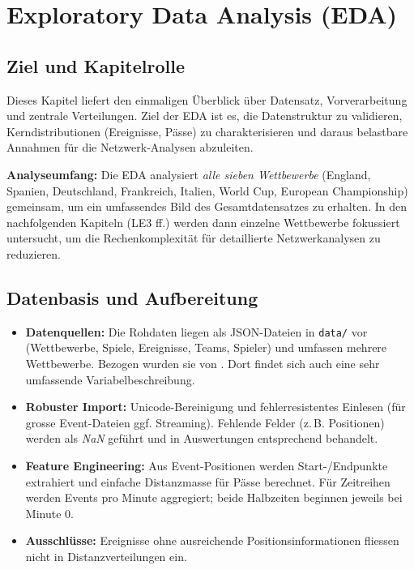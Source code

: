 \section{Exploratory Data Analysis (EDA)}

\subsection{Ziel und Kapitelrolle}
Dieses Kapitel liefert den einmaligen Überblick über Datensatz, Vorverarbeitung und zentrale Verteilungen. Ziel der EDA ist es, die Datenstruktur zu validieren, Kerndistributionen (Ereignisse, Pässe) zu charakterisieren und daraus belastbare Annahmen für die Netzwerk-Analysen abzuleiten.

\textbf{Analyseumfang:} Die EDA analysiert \emph{alle sieben Wettbewerbe} (England, Spanien, Deutschland, Frankreich, Italien, World Cup, European Championship) gemeinsam, um ein umfassendes Bild des Gesamtdatensatzes zu erhalten. In den nachfolgenden Kapiteln (LE3 ff.) werden dann einzelne Wettbewerbe fokussiert untersucht, um die Rechenkomplexität für detaillierte Netzwerkanalysen zu reduzieren.

\subsection{Datenbasis und Aufbereitung}
\begin{itemize}
  \item \textbf{Datenquellen:} Die Rohdaten liegen als JSON-Dateien in \texttt{data/} vor (Wettbewerbe, Spiele, Ereignisse, Teams, Spieler) und umfassen mehrere Wettbewerbe. Bezogen wurden sie von \cite{pappalardo-2019}. Dort findet sich auch eine sehr umfassende Variabelbeschreibung.
  \item \textbf{Robuster Import:} Unicode-Bereinigung und fehlerresistentes Einlesen (für grosse Event-Dateien ggf. Streaming). Fehlende Felder (z.\,B. Positionen) werden als \textit{NaN} geführt und in Auswertungen entsprechend behandelt.
  \item \textbf{Feature Engineering:} Aus Event-Positionen werden Start-/Endpunkte extrahiert und einfache Distanzmasse für Pässe berechnet. Für Zeitreihen werden Events pro Minute aggregiert; beide Halbzeiten beginnen jeweils bei Minute 0.
  \item \textbf{Ausschlüsse:} Ereignisse ohne ausreichende Positionsinformationen fliessen nicht in Distanzverteilungen ein.
\end{itemize}

